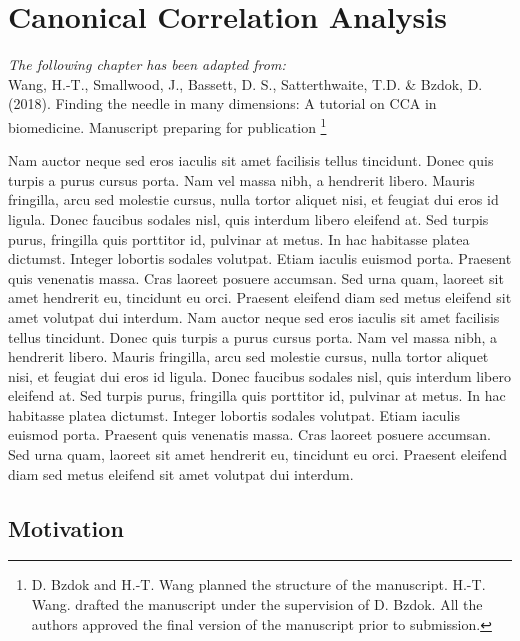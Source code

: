 \chapter{Canonical Correlation Analysis}
\label{ch:methods}


\textit{The following chapter has been adapted from:\\}
Wang, H.-T., Smallwood, J., Bassett, D. S., Satterthwaite, T.D. \& Bzdok, D. (2018). Finding the needle in many dimensions: A tutorial on CCA in biomedicine. Manuscript preparing for publication
\footnote{
D. Bzdok and H.-T. Wang planned the structure of the manuscript.  H.-T. Wang. drafted the manuscript under the supervision of D. Bzdok. All the authors approved the final version of the manuscript prior to submission.}\\
\newpage

\noindent{}Nam auctor neque sed eros iaculis sit amet facilisis tellus tincidunt. Donec quis turpis a purus cursus porta. Nam vel massa nibh, a hendrerit libero. Mauris fringilla, arcu sed molestie cursus, nulla tortor aliquet nisi, et feugiat dui eros id ligula. Donec faucibus sodales nisl, quis interdum libero eleifend at. Sed turpis purus, fringilla quis porttitor id, pulvinar at metus. In hac habitasse platea dictumst. Integer lobortis sodales volutpat. Etiam iaculis euismod porta. Praesent quis venenatis massa. Cras laoreet posuere accumsan. Sed urna quam, laoreet sit amet hendrerit eu, tincidunt eu orci. Praesent eleifend diam sed metus eleifend sit amet volutpat dui interdum. Nam auctor neque sed eros iaculis sit amet facilisis tellus tincidunt. Donec quis turpis a purus cursus porta. Nam vel massa nibh, a hendrerit libero. Mauris fringilla, arcu sed molestie cursus, nulla tortor aliquet nisi, et feugiat dui eros id ligula. Donec faucibus sodales nisl, quis interdum libero eleifend at. Sed turpis purus, fringilla quis porttitor id, pulvinar at metus. In hac habitasse platea dictumst. Integer lobortis sodales volutpat. Etiam iaculis euismod porta. Praesent quis venenatis massa. Cras laoreet posuere accumsan. Sed urna quam, laoreet sit amet hendrerit eu, tincidunt eu orci. Praesent eleifend diam sed metus eleifend sit amet volutpat dui interdum.



\section{Motivation}
\label{CCA:motivation}

